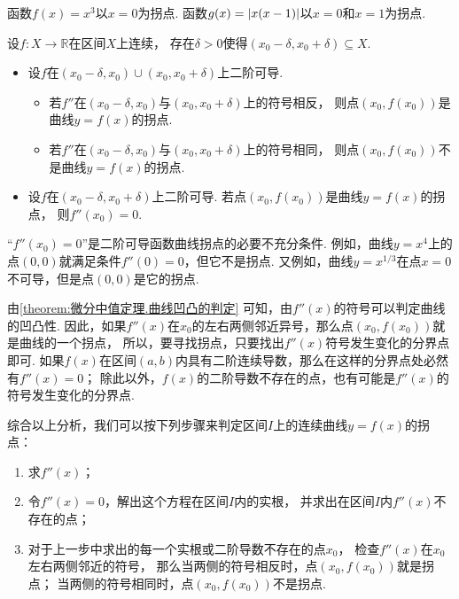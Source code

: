 \begin{example}
函数\(f(x) = x^3\)以\(x=0\)为拐点.
函数\(g(x) = \abs{x(x-1)}\)以\(x=0\)和\(x=1\)为拐点.
\end{example}

\begin{theorem}
设\(f\colon X\to\mathbb{R}\)在区间\(X\)上连续，
存在\(\delta>0\)使得\((x_0-\delta,x_0+\delta) \subseteq X\).
\begin{itemize}
	\item 设\(f\)在\((x_0-\delta,x_0)\cup(x_0,x_0+\delta)\)上二阶可导.
	\begin{itemize}
		\item 若\(f''\)在\((x_0-\delta,x_0)\)与\((x_0,x_0+\delta)\)上的符号相反，
		则点\((x_0,f(x_0))\)是曲线\(y=f(x)\)的拐点.
		\item 若\(f''\)在\((x_0-\delta,x_0)\)与\((x_0,x_0+\delta)\)上的符号相同，
		则点\((x_0,f(x_0))\)不是曲线\(y=f(x)\)的拐点.
	\end{itemize}

	\item 设\(f\)在\((x_0-\delta,x_0+\delta)\)上二阶可导.
	若点\((x_0,f(x_0))\)是曲线\(y=f(x)\)的拐点，
	则\(f''(x_0) = 0\).
\end{itemize}
\end{theorem}
\begin{remark}
“\(f''(x_0) = 0\)”是二阶可导函数曲线拐点的必要不充分条件.
例如，曲线\(y = x^4\)上的点\((0,0)\)就满足条件\(f''(0) = 0\)，但它不是拐点.
又例如，曲线\(y = x^{1/3}\)在点\(x=0\)不可导，但是点\((0,0)\)是它的拐点.
\end{remark}

由\cref{theorem:微分中值定理.曲线凹凸的判定} 可知，由\(f''(x)\)的符号可以判定曲线的凹凸性.
因此，如果\(f''(x)\)在\(x_0\)的左右两侧邻近异号，那么点\((x_0,f(x_0))\)就是曲线的一个拐点，
所以，要寻找拐点，只要找出\(f''(x)\)符号发生变化的分界点即可.
如果\(f(x)\)在区间\((a,b)\)内具有二阶连续导数，那么在这样的分界点处必然有\(f''(x)=0\)；
除此以外，\(f(x)\)的二阶导数不存在的点，也有可能是\(f''(x)\)的符号发生变化的分界点.

{\color{red}
综合以上分析，我们可以按下列步骤来判定区间\(I\)上的连续曲线\(y=f(x)\)的拐点：
\begin{enumerate}
	\item 求\(f''(x)\)；

	\item 令\(f''(x) = 0\)，解出这个方程在区间\(I\)内的实根，
	并求出在区间\(I\)内\(f''(x)\)不存在的点；

	\item 对于上一步中求出的每一个实根或二阶导数不存在的点\(x_0\)，
	检查\(f''(x)\)在\(x_0\)左右两侧邻近的符号，
	那么当两侧的符号相反时，点\((x_0,f(x_0))\)就是拐点；
	当两侧的符号相同时，点\((x_0,f(x_0))\)不是拐点.
\end{enumerate}}

